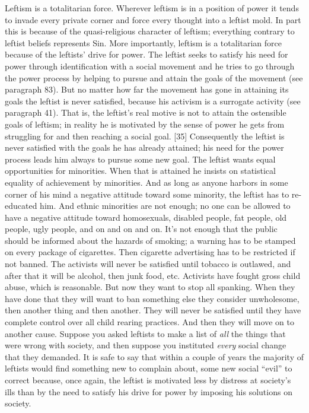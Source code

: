  Leftism is a totalitarian force. Wherever leftism is in a position of power it tends to invade every private corner and force every thought into a leftist mold. In part this is because of the quasi-religious character of leftism; everything contrary to leftist beliefs represents Sin. More importantly, leftism is a totalitarian force because of the leftists’ drive for power. The leftist seeks to satisfy his need for power through identification with a social movement and he tries to go through the power process by helping to pursue and attain the goals of the movement (see paragraph 83). But no matter how far the movement has gone in attaining its goals the leftist is never satisfied, because his activism is a surrogate activity (see paragraph 41). That is, the leftist’s real motive is not to attain the ostensible goals of leftism; in reality he is motivated by the sense of power he gets from struggling for and then reaching a social goal. [35] Consequently the leftist is never satisfied with the goals he has already attained; his need for the power process leads him always to pursue some new goal. The leftist wants equal opportunities for minorities. When that is attained he insists on statistical equality of achievement by minorities. And as long as anyone harbors in some corner of his mind a negative attitude toward some minority, the leftist has to re-educated him. And ethnic minorities are not enough; no one can be allowed to have a negative attitude toward homosexuals, disabled people, fat people, old people, ugly people, and on and on and on. It’s not enough that the public should be informed about the hazards of smoking; a warning has to be stamped on every package of cigarettes. Then cigarette advertising has to be restricted if not banned. The activists will never be satisfied until tobacco is outlawed, and after that it will be alcohol, then junk food, etc. Activists have fought gross child abuse, which is reasonable. But now they want to stop all spanking. When they have done that they will want to ban something else they consider unwholesome, then another thing and then another. They will never be satisfied until they have complete control over all child rearing practices. And then they will move on to another cause.
 Suppose you asked leftists to make a list of {\em all} the things that were wrong with society, and then suppose you instituted {\em every} social change that they demanded. It is safe to say that within a couple of years the majority of leftists would find something new to complain about, some new social “evil” to correct because, once again, the leftist is motivated less by distress at society’s ills than by the need to satisfy his drive for power by imposing his solutions on society.
